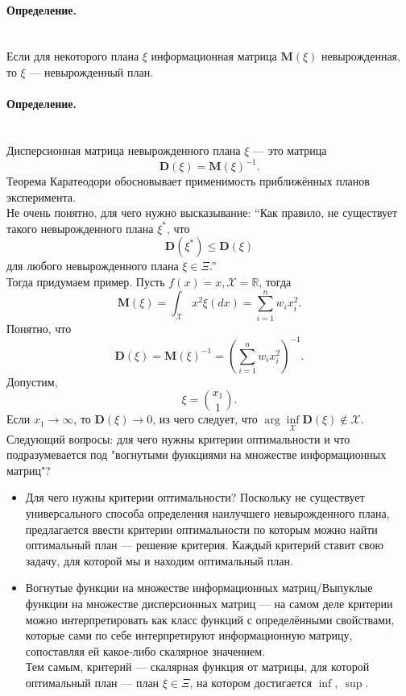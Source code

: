 \documentclass[12pt, a4paper]{article}
\newenvironment{definition}{\paragraph{Определение.}\hfill\\}{}
\newcommand{\R}{\mathbb{R}}
\begin{document}
	\begin{definition}
		Если для некоторого плана $\xi$ информационная матрица $\mathbf{M}(\xi)$ невырожденная, то $\xi$ --- невырожденный план.
	\end{definition}
	\begin{definition}
		Дисперсионная матрица невырожденного плана $\xi$ --- это матрица
		\begin{equation*}
			\mathbf{D}(\xi) = \mathbf{M}(\xi)^{-1}.
		\end{equation*}
	\end{definition}
	Теорема Каратеодори обосновывает применимость приближённых планов эксперимента.\\
	Не очень понятно, для чего нужно высказывание: ``Как правило, не существует такого невырожденного плана $\xi^*$, что
	\begin{equation*}
		\mathbf{D}(\xi^*)\leqslant \mathbf{D}(\xi)
	\end{equation*}
	для любого невырожденного плана $\xi\in\Xi$.''\\
	Тогда придумаем пример. Пусть $f(x) = x, \mathcal{X} = \R$, тогда \begin{equation*}
		\mathbf{M}(\xi)=\int_\mathcal{X}x^2\xi(dx)=\sum_{i=1}^n w_ix_i^2.
	\end{equation*}
	Понятно, что
	\begin{equation*}
		\mathbf{D}(\xi)=\mathbf{M}(\xi)^{-1}=\left(\sum\limits_{i=1}^n w_ix_i^2\right)^{-1}.
	\end{equation*}
	Допустим,
	\begin{equation*}
		\xi = {x_1 \choose 1}.
	\end{equation*}
	Если $x_1\rightarrow\infty$, то $\mathbf{D}(\xi)\rightarrow 0$, из чего следует, что $\arg\inf\limits_{\mathcal{X}}\mathbf{D}(\xi)\not\in\mathcal{X}$.\\
	Следующий вопросы: для чего нужны критерии оптимальности и что подразумевается под "вогнутыми функциями на множестве информационных матриц"? 
	\begin{itemize}
		\item Для чего нужны критерии оптимальности? Поскольку не существует универсального способа определения наилучшего невырожденного плана, предлагается ввести критерии оптимальности по которым можно найти оптимальный план --- решение критерия. Каждый критерий ставит свою задачу, для которой мы и находим оптимальный план.
		\item Вогнутые функции на множестве информационных матриц/Выпуклые функции на множестве дисперсионных матриц --- на самом деле критерии можно интерпретировать как класс функций с определёнными свойствами, которые сами по себе интерпретируют информационную матрицу, сопоставляя ей какое-либо скалярное значением.\\
		Тем самым, критерий --- скалярная функция от матрицы, для которой оптимальный план --- план $\xi\in\Xi$, на котором достигается $\inf,~\sup$. 
	\end{itemize}
\end{document}
